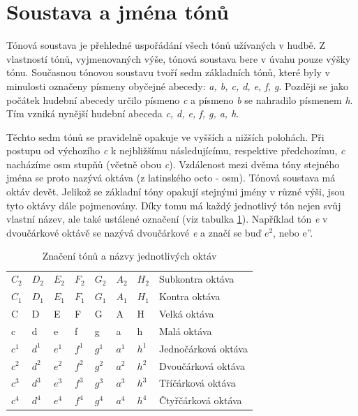 \section{Soustava a jména tónů}
Tónová soustava je přehledné uspořádání všech tónů užívaných v hudbě.
Z vlastností tónů, vyjmenovaných výše, tónová soustava bere v úvahu pouze výšky tónu. 
Současnou tónovou soustavu tvoří sedm základních tónů, které
byly v minulosti označeny písmeny obyčejné abecedy: \emph{a, b, c, d, e, f, g}.
Později se jako počátek hudební abecedy určilo písmeno \emph{c} 
a písmeno \emph{b} se nahradilo písmenem \emph{h}.
Tím vzniká nynější hudební abeceda \emph{c, d, e, f, g, a, h}.
\par

Těchto sedm tónů se pravidelně opakuje ve vyšších a nižších polohách.
Při postupu od výchozího \emph{c} k nejbližšímu následujícímu, respektive předchozímu, \emph{c} nacházíme osm stupňů 
(včetně obou \emph{c}).
Vzdálenost mezi dvěma tóny stejného jména se proto nazývá oktáva (z latinského octo - osm).
Tónová soustava má oktáv devět.
Jelikož se základní tóny opakují stejnými jmény v různé výši,
jsou tyto oktávy dále pojmenovány.
Díky tomu má každý jednotlivý tón nejen svůj vlastní název,
ale také ustálené označení (viz tabulka \ref{tabulkaOktav}).
Například tón \emph{e} v dvoučárkové oktávě se nazývá dvoučárkové \emph{e}
a značí se buď $e^2$, nebo{ e''}.
\cite{zenkl,cmiral}
\par

\begin{table}[]
    \begin{tabular}{ l l l l l l l | l }
        $C_2$ & $D_2$ & $E_2$ & $F_2$ & $G_2$ & $A_2$ & $H_2$ & Subkontra oktáva    \\
        $C_1$ & $D_1$ & $E_1$ & $F_1$ & $G_1$ & $A_1$ & $H_1$ & Kontra oktáva       \\
        C     & D     & E     & F     & G     & A     & H     & Velká oktáva        \\
        c     & d     & e     & f     & g     & a     & h     & Malá oktáva         \\
        $c^1$ & $d^1$ & $e^1$ & $f^1$ & $g^1$ & $a^1$ & $h^1$ & Jednočárková oktáva \\
        $c^2$ & $d^2$ & $e^2$ & $f^2$ & $g^2$ & $a^2$ & $h^2$ & Dvoučárková oktáva  \\
        $c^3$ & $d^3$ & $e^3$ & $f^3$ & $g^3$ & $a^3$ & $h^3$ & Tříčárková oktáva   \\
        $c^4$ & $d^4$ & $e^4$ & $f^4$ & $g^4$ & $a^4$ & $h^4$ & Čtyřčárková oktáva  \\
    \end{tabular}
    \caption{Značení tónů a názvy jednotlivých oktáv}
    \label{tabulkaOktav}
\end{table}


